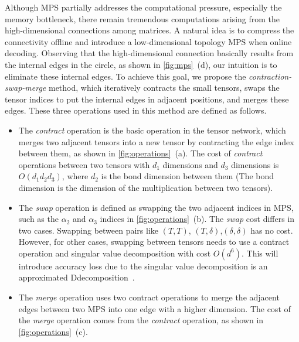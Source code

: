 Although MPS partially addresses the computational pressure, especially the memory bottleneck, there remain tremendous computations arising from the high-dimensional connections among matrices. A natural idea is to compress the connectivity offline and introduce a low-dimensional topology MPS when online decoding. Observing that the high-dimensional connection basically results from the internal edges in the circle, as shown in \autoref{fig:mps}~(d), our intuition is to eliminate these internal edges. To achieve this goal, we propose the \textit{contraction-swap-merge} method, which iteratively contracts the small tensors, swaps the tensor indices to put the internal edges in adjacent positions, and merges these edges. These three operations used in this method are defined as follows.
\begin{itemize}
    \item The \textit{contract} operation is the basic operation in the tensor network, which merges two adjacent tensors into a new tensor by contracting the edge index between them, as shown in \autoref{fig:operations}~(a). The cost of \textit{contract} operations between two tensors with $d_1$ dimensions and  $d_3$ dimensions is $O(d_1d_2d_3)$, where $d_2$ is the bond dimension between them (The bond dimension is the dimension of the multiplication between two tensors). 
    
    \item The \textit{swap} operation is defined as swapping the two adjacent indices in MPS, such as the $\alpha_2$ and $\alpha_3$ indices in \autoref{fig:operations}~(b). The \textit{swap} cost differs in two cases. Swapping between pairs like $(T,T)$, $(T,\delta)$,$(\delta,\delta)$ has no cost. However, for other cases, swapping between tensors needs to use a contract operation and singular value decomposition with cost $O(d^6)$. This will introduce accuracy loss due to the singular value decomposition is an approximated Ddecomposition~\cite{ma2024approximate}. 
    
    \item The \textit{merge} operation uses two contract operations to merge the adjacent edges between two MPS into one edge with a higher dimension. The cost of the \textit{merge} operation comes from the \textit{contract} operation, as shown in \autoref{fig:operations}~(c).
\end{itemize}


